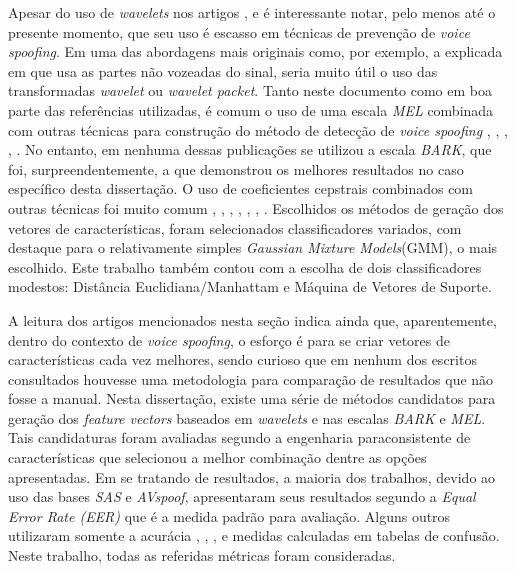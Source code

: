 		\par Apesar do uso de \textit{wavelets} nos artigos \cite{DiqunYan2019}, \cite{Patel2015} e \cite{7802552} é interessante notar, pelo menos até o presente momento, que seu uso é escasso em técnicas de prevenção de \textit{voice spoofing}. Em uma das abordagens mais originais como, por exemplo, a explicada em \cite{ISI:000490497200068} que usa as partes não vozeadas do sinal, seria muito útil o uso das transformadas \textit{wavelet} ou \textit{wavelet packet}. Tanto neste documento como em boa parte das referências utilizadas, é comum o uso de uma escala \textit{MEL} combinada com outras técnicas para construção do método de detecção de \textit{voice spoofing} \cite{Hanilci2018}, \cite{Patel2015}, \cite{8396208}, \cite{8725688}, \cite{ISI:000490497200068}. No entanto, em nenhuma dessas publicações se utilizou a escala \textit{BARK}, que foi, surpreendentemente, a que demonstrou  os melhores resultados no caso específico desta dissertação. O uso de coeficientes cepstrais combinados com outras técnicas foi muito comum \cite{alluri2019replay}, \cite{7802552}, \cite{8725688}, \cite{Hanilci2018}, \cite{TODISCO2017516}, \cite{Patel2015}, \cite{ISI:000392503100008}. Escolhidos os métodos de geração dos vetores de características, foram selecionados classificadores variados, com destaque para o relativamente simples \textit{Gaussian Mixture Models}(GMM), o mais escolhido. Este trabalho também contou com a escolha de dois classificadores modestos: Distância Euclidiana/Manhattam e Máquina de Vetores de Suporte.
		\par A leitura dos artigos mencionados nesta seção indica ainda que, aparentemente, dentro do contexto de \textit{voice spoofing}, o esforço é para se criar vetores de características cada vez melhores, sendo curioso que em nenhum dos escritos consultados houvesse uma metodologia para comparação de resultados que não fosse a manual. Nesta dissertação, existe uma série de métodos candidatos para geração dos \textit{feature vectors} baseados em \textit{wavelets} e nas escalas \textit{BARK} e \textit{MEL}. Tais candidaturas foram avaliadas segundo a engenharia paraconsistente de características que selecionou a melhor combinação dentre as opções apresentadas. Em se tratando de resultados, a maioria dos trabalhos, devido ao uso das bases \textit{SAS} e \textit{AVspoof}, apresentaram seus resultados segundo a \textit{Equal Error Rate (EER)} que é a medida padrão para avaliação. Alguns outros utilizaram somente a acurácia \cite{8396208}, \cite{ISI:000473343500086}, \cite{DiqunYan2019}, \cite{Ren2019} e medidas calculadas em tabelas de confusão. Neste trabalho, todas as referidas métricas foram consideradas.
